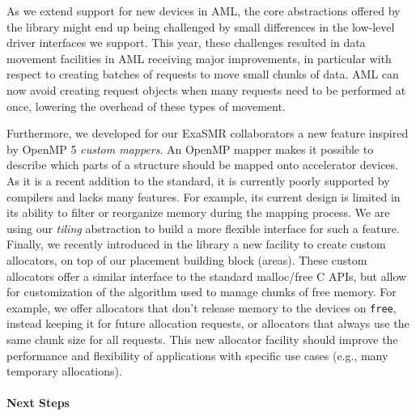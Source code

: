 As we extend support for new devices in AML, the core abstractions offered
by the library might end up being challenged by small differences in the
low-level driver interfaces we support. This year, these challenges
resulted in data movement facilities in AML receiving major improvements,
in particular with respect to creating batches of requests to move small
chunks of data. AML can now avoid creating request objects when many
requests need to be performed at once, lowering the overhead of these types
of movement.

Furthermore, we developed for our ExaSMR collaborators a new feature
inspired by OpenMP 5 \emph{custom mappers}. An OpenMP mapper makes it
possible to describe which parts of a structure should be mapped onto
accelerator devices. As it is a recent addition to the standard, it is
currently poorly supported by compilers and lacks many features. For
example, its current design is limited in its ability to filter or
reorganize memory during the mapping process. We are using our
\emph{tiling} abstraction to build a more flexible interface for such a
feature.    Finally, we recently introduced in the library a new facility
to create custom allocators, on top of our placement building block
(areas). These custom allocators offer a similar interface to the standard
malloc/free C APIs, but allow for customization of the algorithm used to
manage chunks of free memory. For example, we offer allocators that don't
release memory to the devices on \texttt{free}, instead keeping it for
future allocation requests, or allocators that always use the same chunk
size for all requests. This new allocator facility should improve the
performance and flexibility of applications with specific use cases (e.g.,
many temporary allocations).

\paragraph{Next Steps}

